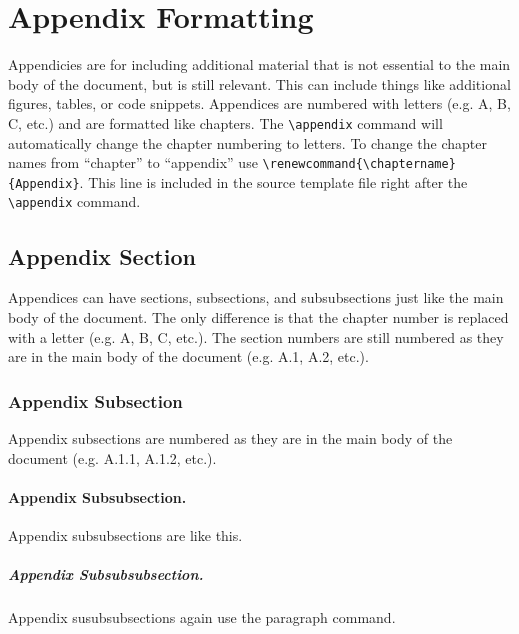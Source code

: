 \documentclass{thesis-dissertation}
\begin{document}
\printbibliography{}

\appendix
\renewcommand\chaptername{Appendix} %
\chapter{Appendix Formatting}
Appendicies are for including additional material that is not essential to the main body of the document, but is still relevant. This can include things like additional figures, tables, or code snippets. Appendices are numbered with letters (e.g. A, B, C, etc.) and are formatted like chapters. The \verb|\appendix| command will automatically change the chapter numbering to letters. To change the chapter names from ``chapter'' to ``appendix'' use \verb|\renewcommand{\chaptername}{Appendix}|. This line is included in the source template file right after the \verb|\appendix| command.
\section{Appendix Section}
Appendices can have sections, subsections, and subsubsections just like the main body of the document. The only difference is that the chapter number is replaced with a letter (e.g. A, B, C, etc.). The section numbers are still numbered as they are in the main body of the document (e.g. A.1, A.2, etc.).
\subsection{Appendix Subsection}
Appendix subsections are numbered as they are in the main body of the document (e.g. A.1.1, A.1.2, etc.).
\subsubsection{Appendix Subsubsection.}
Appendix subsubsections are like this.
\paragraph{Appendix Subsubsubsection.}
Appendix susubsubsections again use the paragraph command.
\end{document}
